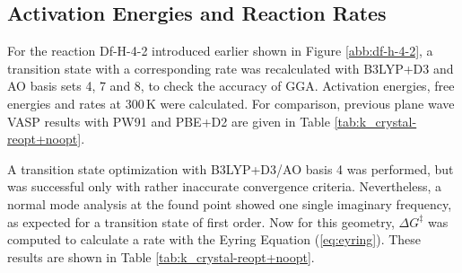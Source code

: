 \documentclass[11pt,DIV=13,BCOR=5mm,a4paper,headinclude]{scrbook}
\begin{document}
\subsection{Activation Energies and Reaction Rates}\label{crystal-rate}
For the reaction Df-H-4-2 introduced earlier shown in Figure \ref{abb:df-h-4-2}, a transition state with a corresponding rate was recalculated with B3LYP+D3 and AO basis sets 4, 7 and 8, to check the accuracy of GGA.
Activation energies, free energies and rates at $300\,$K were calculated.
For comparison, previous plane wave VASP results with PW91 and PBE+D2 are given in Table \ref{tab:k_crystal-reopt+noopt}.


A transition state optimization with B3LYP+D3/AO basis 4 was performed, but was successful only with rather inaccurate convergence criteria.
Nevertheless, a normal mode analysis at the found point showed one single imaginary frequency, as expected for a transition state of first order.
Now for this geometry, $\Delta G^\ddagger$ was computed to calculate a rate with the Eyring Equation (\ref{eq:eyring}).
These results are shown in Table \ref{tab:k_crystal-reopt+noopt}. %
\end{document}
